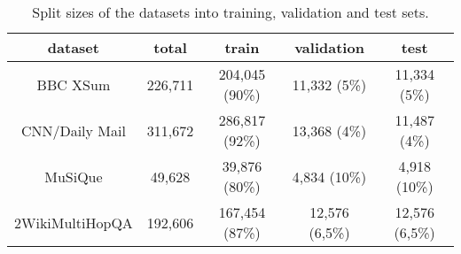 \begin{table}[hbt!]
\centering
\begin{tabular}{c|c|c|c|c}
dataset & total & train & validation & test \\
\hline
BBC XSum \cite{narayan2018dont} & 226,711 & 204,045 (90\%) & 11,332 (5\%) & 11,334 (5\%) \\
CNN/Daily Mail \cite{nallapati2016abstractive} & 311,672 & 286,817 (92\%) & 13,368 (4\%) &  11,487 (4\%) \\
MuSiQue \cite{musiqueQA} & 49,628 & 39,876 (80\%) & 4,834 (10\%) & 4,918 (10\%)  \\
2WikiMultiHopQA \cite{wikimultihopQA} & 192,606 & 167,454 (87\%) & 12,576 (6,5\%) & 12,576 (6,5\%) \\
\end{tabular}
\caption{Split sizes of the datasets into training, validation and test sets.}
\label{tab:dataset_splits}
\end{table}